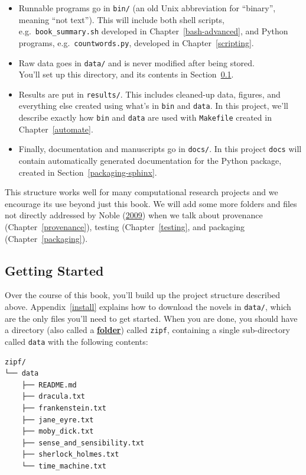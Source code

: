 \documentclass[
]{krantz}
\newcommand{\gref}[2]{\hyperlink{#2}{\textbf{#1}}}
\begin{document}
\begin{itemize}
\item
  Runnable programs go in \texttt{bin/}
  (an old Unix abbreviation for ``binary'', meaning ``not text'').
  This will include both shell scripts,
  e.g.~\texttt{book\_summary.sh} developed in Chapter~\ref{bash-advanced},
  and Python programs,
  e.g.~\texttt{countwords.py}, developed in Chapter~\ref{scripting}.
\item
  Raw data goes in \texttt{data/}
  and is never modified after being stored.\\
  You'll set up this directory,
  and its contents in Section~\ref{intro-setup}.
\item
  Results are put in \texttt{results/}.
  This includes cleaned-up data,
  figures,
  and everything else created using what's in \texttt{bin} and \texttt{data}.
  In this project,
  we'll describe exactly how \texttt{bin} and \texttt{data} are used
  with \texttt{Makefile} created in Chapter~\ref{automate}.
\item
  Finally,
  documentation and manuscripts go in \texttt{docs/}.
  In this project \texttt{docs} will contain automatically generated
  documentation for the Python package, created in
  Section~\ref{packaging-sphinx}.
\end{itemize}

This structure works well for many computational research projects and
we encourage its use beyond just this book.
We will add some more folders and files not directly addressed by Noble (\protect\hyperlink{ref-Nobl2009}{2009})
when we talk about provenance (Chapter~\ref{provenance}),
testing (Chapter~\ref{testing},
and packaging (Chapter~\ref{packaging}).

\hypertarget{intro-setup}{%
\subsection{Getting Started}\label{intro-setup}}

Over the course of this book,
you'll build up the project structure described above.
Appendix~\ref{install} explains
how to download the novels in \texttt{data/},
which are the only files you'll need to get started.
When you are done,
you should have a directory (also called a \gref{folder}{folder})
called \texttt{zipf},
containing a single sub-directory called \texttt{data}
with the following contents:

\begin{verbatim}
zipf/
└── data
    ├── README.md
    ├── dracula.txt
    ├── frankenstein.txt
    ├── jane_eyre.txt
    ├── moby_dick.txt
    ├── sense_and_sensibility.txt
    ├── sherlock_holmes.txt
    └── time_machine.txt
\end{verbatim}
\end{document}
